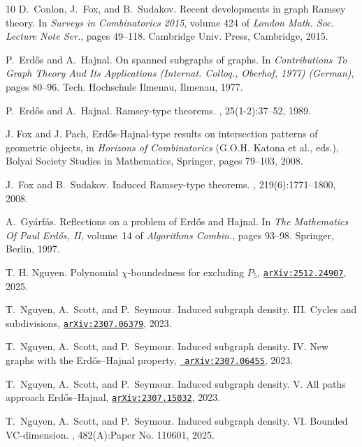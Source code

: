 \documentclass[11pt,reqno,a4paper]{amsart}
\begin{document}
\begin{thebibliography}{10}
		 D.~Conlon, J.~Fox, and B.~Sudakov.  \newblock Recent developments in graph {R}amsey theory.  \newblock In {\em Surveys in Combinatorics 2015}, volume 424 of {\em London Math. Soc. Lecture Note Ser.}, pages 49--118. Cambridge Univ. Press, Cambridge, 2015.
		
		P.~Erd\H{o}s and A.~Hajnal.
		\newblock On spanned subgraphs of graphs.
		\newblock In {\em Contributions To Graph Theory And Its Applications
			({I}nternat. {C}olloq., {O}berhof, 1977) ({G}erman)}, pages 80--96. Tech.
		Hochschule Ilmenau, Ilmenau, 1977.
		
		P.~Erd\H{o}s and A.~Hajnal.
		\newblock Ramsey-type theorems.
		, 25(1-2):37--52, 1989.
		
		J. Fox and J. Pach, Erd\H os-Hajnal-type results on intersection patterns of geometric objects, in {\em Horizons of Combinatorics} (G.O.H. Katona et al., eds.), Bolyai Society Studies in Mathematics, Springer, pages 79--103, 2008.
		
		J.~Fox and B.~Sudakov.
		\newblock Induced {R}amsey-type theorems.
		, 219(6):1771--1800, 2008.
		
		A.~Gy{\'a}rf{\'a}s.
		\newblock Reflections on a problem of {E}rd{\H o}s and {H}ajnal.
		\newblock In {\em The Mathematics Of {P}aul {E}rd{\H o}s, {II}}, volume~14 of
		{\em Algorithms Combin.}, pages 93--98. Springer, Berlin, 1997.
		
		T. H. Nguyen.
		Polynomial $\chi$-boundedness for excluding $P_5$,
		\href{https://arxiv.org/abs/2512.24907}{\tt arXiv:2512.24907}, 2025.
		
		T.~Nguyen, A.~Scott, and P.~Seymour.           
		Induced subgraph density. III. Cycles and subdivisions,
		\href{https://arxiv.org/abs/2307.06379}{\tt arXiv:2307.06379}, 2023. 
		
		
		T.~Nguyen, A.~Scott, and P.~Seymour.
		\newblock Induced subgraph density. IV. New graphs with the Erd{\H
			o}s--{H}ajnal property, \href{https://arxiv.org/abs/2307.06455}{\tt
			arXiv:2307.06455}, 2023.
		
		T.~Nguyen, A.~Scott, and P.~Seymour.
		\newblock Induced subgraph density. V. All paths approach Erd{\H o}s--{H}ajnal,
		\href{https://arxiv.org/abs/2307.15032}{\tt arXiv:2307.15032}, 2023.
		
		T.~Nguyen, A.~Scott, and P.~Seymour.
		\newblock Induced subgraph density. {VI}. {B}ounded {VC}-dimension.
		, 482(A):Paper No. 110601, 2025.
		

\end{thebibliography}
\end{document}
